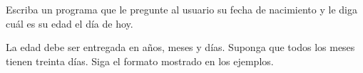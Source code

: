 Escriba un programa que le pregunte al usuario su fecha de nacimiento
y le diga cuál es su edad el día de hoy.

La edad debe ser entregada en años, meses y días.
Suponga que todos los meses tienen treinta días.
Siga el formato mostrado en los ejemplos.

\begin{minipage}[t]{.48\textwidth}
  
\end{minipage}
\hfill
\begin{minipage}[t]{.48\textwidth}
  
\end{minipage}

\begin{minipage}[t]{.48\textwidth}
  
\end{minipage}
\hfill
\begin{minipage}[t]{.48\textwidth}
  
\end{minipage}


